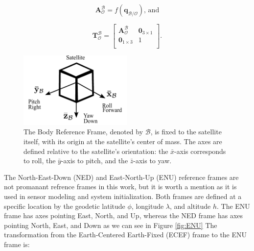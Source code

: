 \begin{equation}
    \mathbf{A}_\mathcal{O}^\mathcal{B} = f(\mathbf{q}_\mathcal{B/O})
    \text{, and}
\end{equation}

\begin{equation}
    \mathbf{T}_\mathcal{O}^\mathcal{B} =
    \begin{bmatrix}
    \mathbf{A}_\mathcal{O}^\mathcal{B} & \mathbf{0}_{3\times1} \\
    \mathbf{0}_{1\times3} & 1 \\
    \end{bmatrix}
    \text{.}
\end{equation}

\begin{figure}[H]
    \centering
    \includegraphics[width=0.5\textwidth]{figures/modelling/BRF.pdf}
    \caption{The Body Reference Frame, denoted by $\mathcal{B}$, is fixed to the satellite itself, with its origin at the satellite’s center of mass. The axes are defined relative to the satellite's orientation: the $\bar{x}$-axis corresponds to roll, the $\bar{y}$-axis to pitch, and the $\bar{z}$-axis to yaw.}
    \label{fig:BRF}
\end{figure}


The North-East-Down (NED) and East-North-Up (ENU) reference frames are not promanant refrence frames in this work, but it is worth a mention
as it is used in sensor modeling and system initialization. Both frames are defined at a specific location by the geodetic latitude $\phi$, longitude $\lambda$, 
and altitude $h$. The ENU frame has axes pointing East, North, and Up, whereas the NED frame has axes pointing North, East, and Down as we can see in Figure \ref{fig:ENU}
The transformation from the Earth-Centered Earth-Fixed (ECEF) frame to the ENU frame is:

